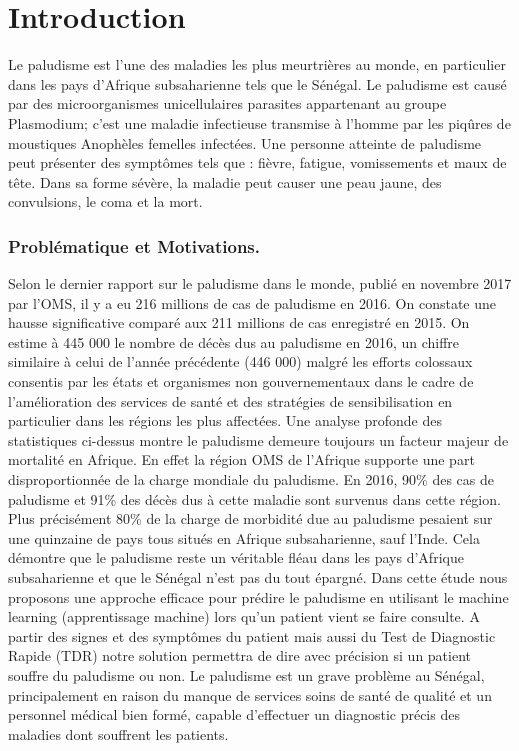 
\section{Introduction}\label{Introduction}
Le paludisme est l’une des maladies les plus meurtrières au monde, en particulier dans les pays d’Afrique subsaharienne tels que le Sénégal. Le paludisme est causé par des microorganismes unicellulaires parasites appartenant au groupe Plasmodium; c'est une maladie infectieuse transmise à l'homme par les piqûres de moustiques Anophèles femelles infectées. Une personne atteinte de paludisme peut présenter des symptômes tels que : fièvre, fatigue, vomissements et maux de tête. Dans sa forme sévère, la maladie peut causer une peau jaune, des convulsions, le coma et  la mort.
\subsubsection{Problématique et Motivations.}
Selon le dernier rapport \cite{Wh17}  sur le paludisme dans le monde, publié en novembre 2017 par l’OMS, il y a eu 216 millions de cas de paludisme en 2016. On constate une hausse significative comparé aux 211 millions de cas enregistré en 2015.
 On estime à 445 000 le nombre de décès dus au paludisme en 2016, un chiffre similaire à celui de l’année précédente (446 000) malgré les efforts colossaux  consentis par les états et organismes non gouvernementaux dans le cadre de l’amélioration des services de santé et des stratégies de sensibilisation en  particulier dans les régions les plus affectées.
Une analyse profonde des statistiques ci-dessus montre le paludisme demeure toujours un facteur majeur de mortalité en Afrique. En effet la région OMS de l'Afrique supporte une part disproportionnée de la charge mondiale du paludisme. En 2016, 90\% des cas de paludisme et 91\% des décès dus à cette maladie sont survenus dans cette région. Plus précisément  80\% de la charge de morbidité due au paludisme pesaient sur une quinzaine de pays tous situés en Afrique subsaharienne, sauf l’Inde. Cela démontre que le paludisme reste un véritable fléau dans les pays d'Afrique subsaharienne et que le Sénégal n'est pas du tout épargné. Dans cette  étude nous proposons une approche  efficace pour prédire le paludisme en utilisant le machine learning (apprentissage machine) lors qu’un patient vient se faire consulte. A partir des signes et des symptômes du patient mais aussi du Test de Diagnostic Rapide (TDR) notre solution permettra de dire avec précision si un  patient souffre du paludisme ou non. 
Le paludisme est un grave problème au Sénégal, principalement en raison du manque de services soins de santé de qualité et un personnel médical bien formé, capable d’effectuer un diagnostic précis des maladies dont souffrent les patients. 
